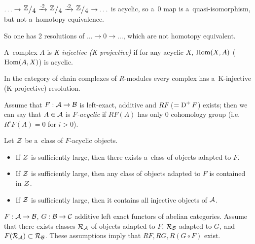 




	\begin{remark}
		$\ldots \to \bigslant{\mb Z}{4} \xrightarrow{\cdot 2} 
		\bigslant{\mb Z}{4} \xrightarrow{\cdot 2} 
		\bigslant{\mb Z}{4} \to \ldots$
		is acyclic, so a~$0$ map is a~quasi-isomorphism, but not a~homotopy
		equivalence.
		
		So one has 2 resolutions of $\ldots \to 0 \to \ldots$, which
		are not homotopy equivalent.
	\end{remark}
	
	\begin{definition}
		A~complex $A$ is {\em K-injective (K-projective)} if for any acyclic $X$,
		$\operatorname{Hom}(X,A)$ ($\operatorname{Hom}(A,X)$) is acyclic.
	\end{definition}
	
	\begin{theorem}[Spatenstein]
		In the category of chain complexes of $R$-modules 
		every complex has a~K-injective (K-projective) resolution.
	\end{theorem}
	
	\begin{definition}[$F$-acyclic]
		Assume that $F:\mathcal{A} \to \mathcal{B}$ is left-exact, additive and
		$RF$ ($=\operatorname{D}^+F$) exists; then we can say that $A \in \mathcal{A}$ is 
		{\em $F$-acyclic}
		if $RF(A)$ has only $0$ cohomology group (i.e. $R^i F(A) = 0$ for $i>0$).
	\end{definition}
	
	\begin{theorem}
		Let ${\mathcal{Z}}$ be a~class of $F$-acyclic objects.
		\begin{itemize}
			\item If ${\mathcal{Z}}$ is sufficiently large,
			then there exists a~class of objects adapted to $F$.
			\item If ${\mathcal{Z}}$ is sufficiently large, 
			then any class of objects adapted to $F$
			is contained in ${\mathcal{Z}}$.
			\item If ${\mathcal{Z}}$ is sufficiently large, 
			then it contains all injective objects of $\mathcal{A}$.
		\end{itemize}
	\end{theorem}
	
	$F: \mathcal{A} \to \mathcal{B}$, $G: \mathcal{B} \to \mathcal{C}$ additive left exact functors
	of abelian categories.
	Assume that there exists classes ${\mathcal{R}}_{\mathcal{A}}$ of objects adapted to $F$,
	${\mathcal{R}}_{\mathcal{B}}$ adapted to $G$, and $F({\mathcal{R}}_{\mathcal{A}}) \subset {\mathcal{R}}_{\mathcal{B}}$.
	These assumptions imply that $RF, RG, R(G \circ F)$ exist.
	
